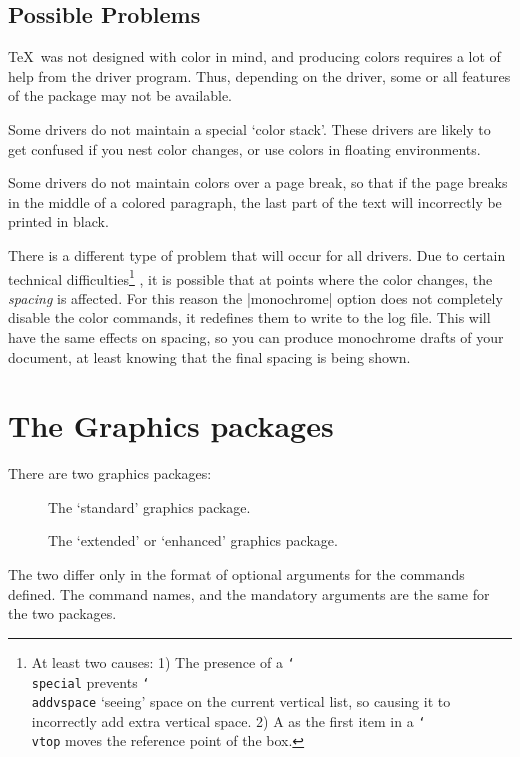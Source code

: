 \subsection{Possible Problems}

\TeX\ was not designed with color in mind, and producing colors
requires a lot of help from the driver program. Thus, depending on the
driver, some or all features of the  package may not be
available.

Some drivers do not maintain a special `color stack'. These drivers are
likely to get confused if you nest color changes, or use colors in
floating environments.

Some drivers do not maintain colors over a page break, so that if the
page breaks in the middle of a colored paragraph, the last part of the
text will incorrectly be printed in black.

There is a different type of problem that will occur for all drivers.
Due to certain technical difficulties\footnote{At least two causes:
1) The presence of a \texttt{\char`\\special}  prevents
\texttt{\char`\\addvspace} `seeing' space on the current vertical list,
so causing it to incorrectly add extra vertical space. 2) A
 as the first item in a \texttt{\char`\\vtop} moves the
reference point of the box.}%
, it is possible that at points
where the color changes, the \emph{spacing} is affected. For this
reason the |monochrome| option does not completely disable the color
commands, it redefines them to write to the log file. This will have the
same effects on spacing, so you can produce monochrome drafts of your
document, at least knowing that the final spacing is being shown.
\section{The Graphics packages}
There are two graphics packages:
\begin{description}
\item[] The `standard' graphics package.
\item[] The `extended' or `enhanced' graphics
  package.
\end{description}
The two differ only in the format of optional arguments for the
commands defined. The command names, and the mandatory arguments are
the same for the two packages.

